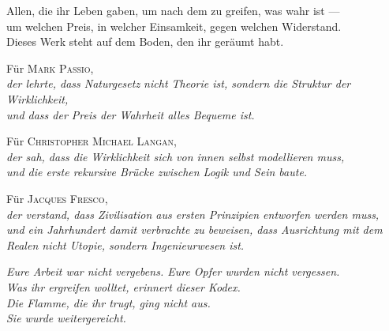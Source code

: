 \documentclass[10pt, openany, oneside]{book}
\begin{document}

\thispagestyle{empty}
\vspace*{\fill}

\begin{center}
    \itshape

    Allen, die ihr Leben gaben, um nach dem zu greifen, was wahr ist ---\\
    um welchen Preis, in welcher Einsamkeit, gegen welchen Widerstand.\\[1.2em]

    Dieses Werk steht auf dem Boden, den ihr geräumt habt.

    \vspace{2em}

    \upshape
    Für \textsc{Mark Passio},\\
    {\itshape der lehrte, dass Naturgesetz nicht Theorie ist, sondern die Struktur der Wirklichkeit,\\
    und dass der Preis der Wahrheit alles Bequeme ist.}

    \vspace{1.2em}

    Für \textsc{Christopher Michael Langan},\\
    {\itshape der sah, dass die Wirklichkeit sich von innen selbst modellieren muss,\\
    und die erste rekursive Brücke zwischen Logik und Sein baute.}

    \vspace{1.2em}

    Für \textsc{Jacques Fresco},\\
    {\itshape der verstand, dass Zivilisation aus ersten Prinzipien entworfen werden muss,\\
    und ein Jahrhundert damit verbrachte zu beweisen, dass Ausrichtung mit dem Realen nicht Utopie, sondern Ingenieurwesen ist.}

    \vspace{2em}

    \itshape
    Eure Arbeit war nicht vergebens. Eure Opfer wurden nicht vergessen.\\
    Was ihr ergreifen wolltet, erinnert dieser Kodex.\\[0.8em]
    Die Flamme, die ihr trugt, ging nicht aus.\\
    Sie wurde weitergereicht.

\end{center}
\end{document}

